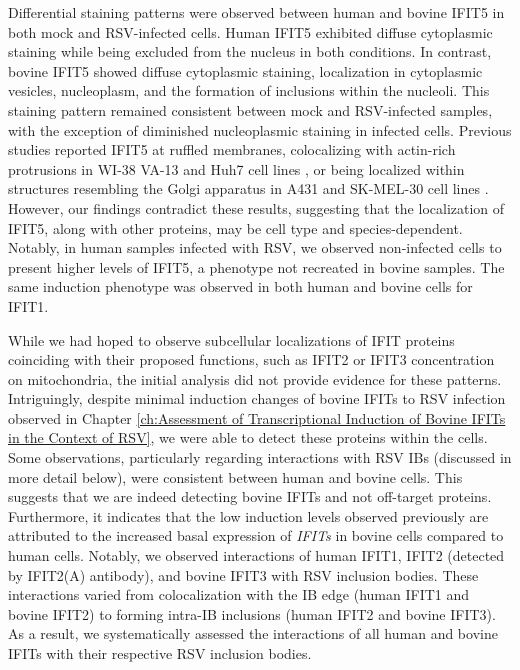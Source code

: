 Differential staining patterns were observed between human and bovine IFIT5 in both mock and RSV-infected cells. Human IFIT5 exhibited diffuse cytoplasmic staining while being excluded from the nucleus in both conditions. In contrast, bovine IFIT5 showed diffuse cytoplasmic staining, localization in cytoplasmic vesicles, nucleoplasm, and the formation of inclusions within the nucleoli. This staining pattern remained consistent between mock and RSV-infected samples, with the exception of diminished nucleoplasmic staining in infected cells. Previous studies reported IFIT5 at ruffled membranes, colocalizing with actin-rich protrusions in WI-38 VA-13 and Huh7 cell lines \cite{Katibah2013TRNAIFIT5}, or being localized within structures resembling the Golgi apparatus in A431 and SK-MEL-30 cell lines \cite{Thul2017AProteome}. However, our findings contradict these results, suggesting that the localization of IFIT5, along with other proteins, may be cell type and species-dependent. Notably, in human samples infected with RSV, we observed non-infected cells to present higher levels of IFIT5, a phenotype not recreated in bovine samples. The same induction phenotype was observed in both human and bovine cells for IFIT1.

While we had hoped to observe subcellular localizations of IFIT proteins coinciding with their proposed functions, such as IFIT2 or IFIT3 concentration on mitochondria, the initial analysis did not provide evidence for these patterns. Intriguingly, despite minimal induction changes of bovine IFITs to RSV infection observed in Chapter \ref{ch:Assessment of Transcriptional Induction of Bovine IFITs in the Context of RSV}, we were able to detect these proteins within the cells. Some observations, particularly regarding interactions with RSV IBs (discussed in more detail below), were consistent between human and bovine cells. This suggests that we are indeed detecting bovine IFITs and not off-target proteins. Furthermore, it indicates that the low induction levels observed previously are attributed to the increased basal expression of \textit{IFITs} in bovine cells compared to human cells. Notably, we observed interactions of human IFIT1, IFIT2 (detected by IFIT2(A) antibody), and bovine IFIT3 with RSV inclusion bodies. These interactions varied from colocalization with the IB edge (human IFIT1 and bovine IFIT2) to forming intra-IB inclusions (human IFIT2 and bovine IFIT3). As a result, we systematically assessed the interactions of all human and bovine IFITs with their respective RSV inclusion bodies.

